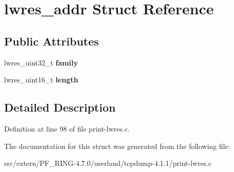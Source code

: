 \hypertarget{structlwres__addr}{
\section{lwres\_\-addr Struct Reference}
\label{structlwres__addr}
}
\subsection*{Public Attributes}
\begin{DoxyCompactItemize}
\item 
\hypertarget{structlwres__addr_a86b038c5d3cd78ddf67169622bac79f1}{
lwres\_\-uint32\_\-t {\bfseries family}}
\label{structlwres__addr_a86b038c5d3cd78ddf67169622bac79f1}

\item 
\hypertarget{structlwres__addr_a5c0788546549d33617258281796430ea}{
lwres\_\-uint16\_\-t {\bfseries length}}
\label{structlwres__addr_a5c0788546549d33617258281796430ea}

\end{DoxyCompactItemize}


\subsection{Detailed Description}


Definition at line 98 of file print-\/lwres.c.



The documentation for this struct was generated from the following file:\begin{DoxyCompactItemize}
\item 
src/extern/PF\_\-RING-\/4.7.0/userland/tcpdump-\/4.1.1/print-\/lwres.c\end{DoxyCompactItemize}
